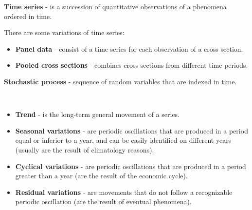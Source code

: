 
	 \begin{f}[Definitions ]

\textbf{Time series} - is a succession of quantitative observations of a phenomena ordered in time.
	
There are some variations of time series:
		\begin{itemize}[leftmargin=*]	
		\item \textbf{Panel data} - consist of a time series for each observation of a cross section.
		\item \textbf{Pooled cross sections} - combines cross sections from different time periods.
	\end{itemize}	
%	
		 \textbf{Stochastic process} - sequence of random variables that are indexed in time.
	\end{f}    
	
	\begin{f}{\ }

	\begin{itemize}[leftmargin=*]
		\item \textbf{Trend} - is the long-term general movement of a series.
		\item \textbf{Seasonal variations} - are periodic oscillations that are produced in a period equal or inferior to a year, and can be easily identified on different years (usually are the result of climatology reasons).
		\item \textbf{Cyclical variations} - are periodic oscillations that are produced in a period greater than a year (are the result of the economic cycle).
		\item \textbf{Residual variations} - are movements that do not follow a recognizable periodic oscillation (are the result of eventual phenomena).
	\end{itemize}
	
	\end{f}    
	
